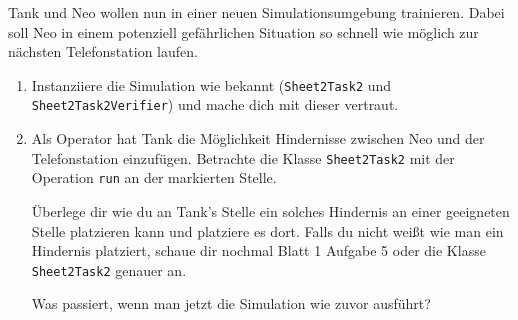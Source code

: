 

Tank und Neo wollen nun in einer neuen Simulationsumgebung trainieren. 
Dabei soll Neo in einem potenziell gefährlichen Situation so schnell wie möglich zur nächsten Telefonstation laufen.

\begin{enumerate}
    \item Instanziiere die Simulation wie bekannt (\lstinline{Sheet2Task2} und \lstinline{Sheet2Task2Verifier}) und mache dich mit dieser vertraut.
    \item Als Operator hat Tank die Möglichkeit Hindernisse zwischen Neo und der Telefonstation einzufügen.
        Betrachte die Klasse \lstinline{Sheet2Task2} mit der Operation \lstinline{run} an der markierten Stelle.

        Überlege dir wie du an Tank's Stelle ein solches Hindernis an einer geeigneten Stelle platzieren kann und platziere es dort. Falls du nicht weißt wie man ein Hindernis platziert, schaue dir nochmal Blatt 1 Aufgabe 5 oder die Klasse \lstinline{Sheet2Task2} genauer an.

        Was passiert, wenn man jetzt die Simulation wie zuvor ausführt?\\
        
\end{enumerate}

